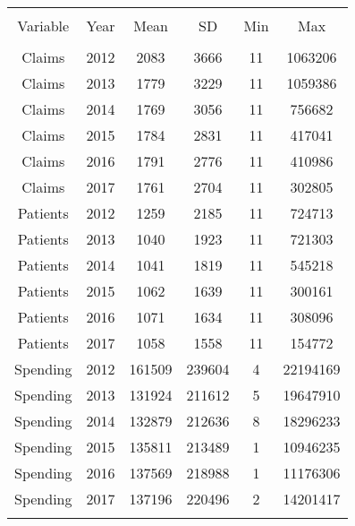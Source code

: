 
\begin{table}[!htbp] \centering 
  \caption{} 
  \label{} 
\begin{tabular}{@{\extracolsep{5pt}} cccccc} 
\\[-1.8ex]\hline 
\hline \\[-1.8ex] 
Variable & Year & Mean & SD & Min & Max \\ 
\hline \\[-1.8ex] 
Claims & 2012 & 2083 & 3666 & 11 & 1063206 \\ 
Claims & 2013 & 1779 & 3229 & 11 & 1059386 \\ 
Claims & 2014 & 1769 & 3056 & 11 & 756682 \\ 
Claims & 2015 & 1784 & 2831 & 11 & 417041 \\ 
Claims & 2016 & 1791 & 2776 & 11 & 410986 \\ 
Claims & 2017 & 1761 & 2704 & 11 & 302805 \\ 
Patients & 2012 & 1259 & 2185 & 11 & 724713 \\ 
Patients & 2013 & 1040 & 1923 & 11 & 721303 \\ 
Patients & 2014 & 1041 & 1819 & 11 & 545218 \\ 
Patients & 2015 & 1062 & 1639 & 11 & 300161 \\ 
Patients & 2016 & 1071 & 1634 & 11 & 308096 \\ 
Patients & 2017 & 1058 & 1558 & 11 & 154772 \\ 
Spending & 2012 & 161509 & 239604 & 4 & 22194169 \\ 
Spending & 2013 & 131924 & 211612 & 5 & 19647910 \\ 
Spending & 2014 & 132879 & 212636 & 8 & 18296233 \\ 
Spending & 2015 & 135811 & 213489 & 1 & 10946235 \\ 
Spending & 2016 & 137569 & 218988 & 1 & 11176306 \\ 
Spending & 2017 & 137196 & 220496 & 2 & 14201417 \\ 
\hline \\[-1.8ex] 
\end{tabular} 
\end{table} 
